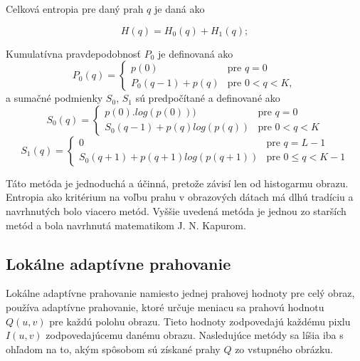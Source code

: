 \documentclass[a4paper,11pt,oneside]{article}%
\begin{document}
Celková entropia pre daný prah $q$ je daná ako

\begin{equation}
H(q) =  H_0(q) + H_1(q);
\end{equation}  
 
Kumulatívna pravdepodobnosť $P_0$ je definovaná ako
\begin{equation}
	P_0(q) = \begin{cases} p(0) & \text{pre } q = 0 \\
                            P_0(q-1) + p(q)         & \text{pre } 0 < q < K ,     %
        \end{cases}
 \end{equation} 
a sumačné podmienky $S_0$, $S_1$ sú predpočítané a definované ako
 \begin{equation}   
    S_0(q) = \begin{cases} p(0).log(p(0))) & \text{pre } q = 0 \\
                            S_0(q-1) + p(q)log(p(q))         & \text{pre } 0 < q < K      
        \end{cases}
        \end{equation}
\begin{equation}
	S_1(q) = \begin{cases} 0 & \text{pre } q = L-1 \\
                            S_0(q+1) + p(q+1)log(p(q+1))         & \text{pre } 0 \leq q < K -1      %
        \end{cases}       	 
\end{equation}

Táto metóda je jednoduchá a účinná, pretože závisí len od histogarmu obrazu. %
Entropia ako kritérium na voľbu prahu v obrazových dátach má dlhú tradíciu a navrhnutých bolo viacero metód. Vyššie uvedená metóda je jednou zo starších metód a bola navrhnutá  matematikom J. N. Kapurom.

\subsection{Lokálne adaptívne prahovanie}

Lokálne adaptívne prahovanie namiesto jednej prahovej hodnoty pre celý obraz, používa adaptívne prahovanie, ktoré určuje meniacu sa prahovú hodnotu $Q(u,v)$ pre každú polohu obrazu. Tieto hodnoty zodpovedajú každému pixlu $I(u,v)$ zodpovedajúcemu danému obrazu. Nasledujúce metódy sa líšia iba s ohľadom na to, akým spôsobom sú získané prahy $Q$ zo vstupného obrázku. 
\end{document}
